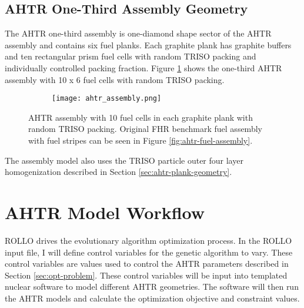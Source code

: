 \subsection{AHTR One-Third Assembly Geometry}
The \gls{AHTR} one-third assembly is one-diamond shape sector of the \gls{AHTR} assembly and
contains six fuel planks.
Each graphite plank has graphite buffers and ten rectangular prism fuel cells 
with random TRISO packing and individually controlled packing fraction. 
Figure \ref{fig:ahtr_assembly} shows the one-third \gls{AHTR} assembly with 10 x 6 fuel cells with 
random \gls{TRISO} packing.
\begin{figure}[]
    \centering
    \begin{subfigure}{.7\textwidth}
    \texttt{[image: ahtr\_assembly.png]}
    \end{subfigure}%
    \begin{subfigure}{.3\textwidth}
        \vspace{1cm}
    \end{subfigure}
    \caption{\gls{AHTR} assembly with 10 fuel cells in each graphite plank with random 
    TRISO packing. Original \gls{FHR} benchmark fuel assembly with fuel stripes can be seen in 
    Figure \ref{fig:ahtr-fuel-assembly}.}
    \label{fig:ahtr_assembly}
\end{figure}
The assembly model also uses the \gls{TRISO} particle outer four layer homogenization described 
in Section \ref{sec:ahtr-plank-geometry}.


\section{AHTR Model Workflow}
\gls{ROLLO} drives the evolutionary algorithm optimization process. 
In the \gls{ROLLO} input file, I will define control variables for the genetic algorithm 
to vary. 
These control variables are values used to control the \gls{AHTR} parameters described in 
Section \ref{sec:opt-problem}.
These control variables will be input into templated nuclear software to model different 
AHTR geometries.
The software will then run the \gls{AHTR} models and calculate the optimization objective 
and constraint values. 

